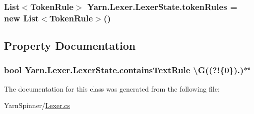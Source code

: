 \hypertarget{a00102_adf6563b1dc6f3ef80ed13c2b15b7be03}{
\subsubsection[{token\-Rules}]{\setlength{\rightskip}{0pt plus 5cm}List$<${\bf Token\-Rule}$>$ Yarn.\-Lexer.\-Lexer\-State.\-token\-Rules = new List$<${\bf Token\-Rule}$>$()}}\label{a00102_adf6563b1dc6f3ef80ed13c2b15b7be03}


\subsection{Property Documentation}
\hypertarget{a00102_a69948f05c35eeae9cb8448c849a053e6}{
\subsubsection[{contains\-Text\-Rule}]{\setlength{\rightskip}{0pt plus 5cm}bool Yarn.\-Lexer.\-Lexer\-State.\-contains\-Text\-Rule \textbackslash{}G((?!\{0\}).)$\ast$\char`\"{}\hspace{0.3cm}{\ttfamily [get]}}}\label{a00102_a69948f05c35eeae9cb8448c849a053e6}


The documentation for this class was generated from the following file\-:\begin{DoxyCompactItemize}
\item 
Yarn\-Spinner/\hyperlink{a00266}{Lexer.\-cs}\end{DoxyCompactItemize}
